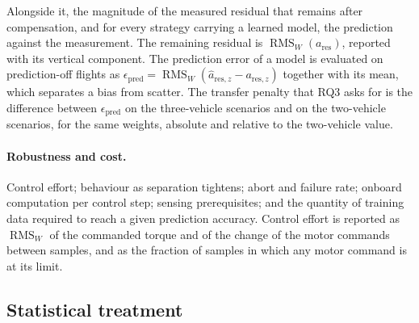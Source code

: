 Alongside it, the magnitude of the measured residual that remains after compensation, and for every
strategy carrying a learned model, the prediction against the measurement.
The remaining residual is $\operatorname{RMS}_W(a_{\mathrm{res}})$, reported with its vertical
component. The prediction error of a model is evaluated on prediction-off flights as
$\epsilon_{\mathrm{pred}} = \operatorname{RMS}_W(\hat a_{\mathrm{res},z} - a_{\mathrm{res},z})$ together
with its mean, which separates a bias from scatter. The transfer penalty that RQ3 asks for is the
difference between $\epsilon_{\mathrm{pred}}$ on the three-vehicle scenarios and on the two-vehicle
scenarios, for the same weights, absolute and relative to the two-vehicle value.

\paragraph{Robustness and cost.} Control effort; behaviour as separation tightens; abort and
failure rate; onboard computation per control step; sensing prerequisites; and the quantity of
training data required to reach a given prediction accuracy.
Control effort is reported as $\operatorname{RMS}_W$ of the commanded torque and of the change of
the motor commands between samples, and as the fraction of samples in which any motor command is
at its limit.

\subsection{Statistical treatment}
\label{sec:setup-stats}

